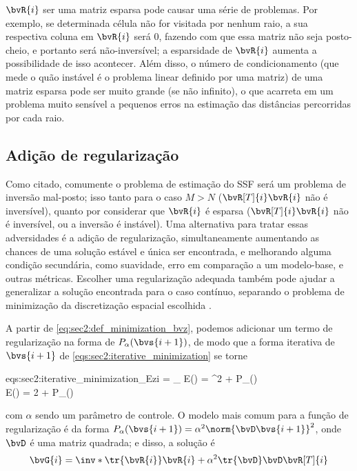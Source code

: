 $\bvR{i}$ ser uma matriz esparsa pode causar uma série de problemas. Por exemplo, se determinada célula não for visitada por nenhum raio, a sua respectiva coluna em $\bvR{i}$ será $0$, fazendo com que essa matriz não seja posto-cheio, e portanto será não-inversível; a esparsidade de $\bvR{i}$ aumenta a possibilidade de isso acontecer. Além disso, o número de condicionamento (que mede o quão instável é o problema linear definido por uma matriz) de uma matriz esparsa pode ser muito grande (se não infinito), o que acarreta em um problema muito sensível a pequenos erros na estimação das distâncias percorridas por cada raio.

\subsection{Adição de regularização}

Como citado, comumente o problema de estimação do SSF será um problema de inversão mal-posto; isso tanto para o caso $M > N$ ($\bvR[T]{i}\bvR{i}$ não é inversível), quanto por considerar que $\bvR{i}$ é esparsa ($\bvR[T]{i}\bvR{i}$ não é inversível, ou a inversão é instável). Uma alternativa para tratar essas adversidades é a adição de regularização, simultaneamente aumentando as chances de uma solução estável e única ser encontrada, e melhorando alguma condição secundária, como suavidade, erro em comparação a um modelo-base, e outras métricas. Escolher uma regularização adequada também pode ajudar a generalizar a solução encontrada para o caso contínuo, separando o problema de minimização da discretização espacial escolhida \cite{zhang_nonlinear_1998,delprat-jannaud_illposed_1993}.

A partir de \cref{eq:sec2:def_minimization_bvz}, podemos adicionar um termo de regularização na forma de $P_{\alpha}(\bvs{i+1})$, de modo que a forma iterativa de $\bvs{i+1}$ de \cref{eqs:sec2:iterative_minimization} se torne
\begin{subgather}		{eqs:sec2:iterative_minimization_Ezi}
	 = \arg\min_{} E() = ^2 + P_\alpha()\\		
	\nabla E() = 2  + \nabla P_{\alpha}()
\end{subgather}
com $\alpha$ sendo um parâmetro de controle. O modelo mais comum para a função de regularização é da forma $P_{\alpha}(\bvs{i+1}) = \alpha^2\norm{\bvD\bvs{i+1}}^2$, onde $\bvD$ é uma matriz quadrada; e disso, a solução é
\begin{equation}
	\bvG{i} = \inv*{\tr{\bvR{i}} \bvR{i} + \alpha^2 \tr{\bvD}\bvD} \bvR[T]{i}
	\label{eq:sec2:solution_regularization-problem_simple}
\end{equation}

